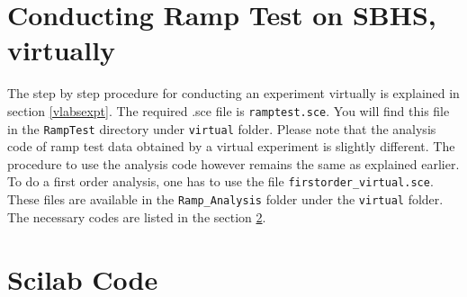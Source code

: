 \section{Conducting Ramp Test on SBHS, virtually}
The step by step procedure for conducting an experiment virtually is explained in section \ref{vlabsexpt}. The required .sce file is {\tt ramptest.sce}.  You will find this file in the {\tt RampTest} directory under {\tt virtual} folder. Please note that the analysis code of ramp test data obtained by a virtual experiment is slightly different. The procedure to use the analysis code however remains the same as explained earlier. To do a first order analysis, one has to use the file {\tt firstorder\_virtual.sce}. These files are available in the {\tt Ramp\_Analysis} folder under the {\tt virtual} folder. The necessary codes are listed in the section \ref{rampcodes}.

\section{Scilab Code}\label{rampcodes}
\begin{code}

\end{code}

\begin{code}

\end{code}

\begin{code}

\end{code}

\begin{code}

\end{code}

\begin{code}

\end{code}

\begin{code}

\end{code}

\begin{code}

\end{code}



